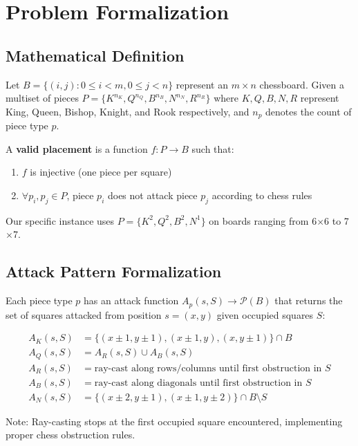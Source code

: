 \documentclass[12pt,a4paper]{article}
\theoremstyle{definition}
\begin{document}
\section{Problem Formalization}

\subsection{Mathematical Definition}

Let $B = \{(i,j) : 0 \leq i < m, 0 \leq j < n\}$ represent an $m \times n$ chessboard. Given a multiset of pieces $P = \{K^{n_K}, Q^{n_Q}, B^{n_B}, N^{n_N}, R^{n_R}\}$ where $K, Q, B, N, R$ represent King, Queen, Bishop, Knight, and Rook respectively, and $n_p$ denotes the count of piece type $p$.

A \textbf{valid placement} is a function $f: P \rightarrow B$ such that:
\begin{enumerate}
\item $f$ is injective (one piece per square)
\item $\forall p_i, p_j \in P$, piece $p_i$ does not attack piece $p_j$ according to chess rules
\end{enumerate}

Our specific instance uses $P = \{K^2, Q^2, B^2, N^1\}$ on boards ranging from 6$\times$6 to 7$\times$7.

\subsection{Attack Pattern Formalization}

Each piece type $p$ has an attack function $A_p(s, S) \rightarrow \mathcal{P}(B)$ that returns the set of squares attacked from position $s=(x,y)$ given occupied squares $S$:

\begin{align}
A_K(s, S) &= \{(x \pm 1, y \pm 1), (x \pm 1, y), (x, y \pm 1)\} \cap B \\
A_Q(s, S) &= A_R(s, S) \cup A_B(s, S) \\
A_R(s, S) &= \text{ray-cast along rows/columns until first obstruction in } S \\
A_B(s, S) &= \text{ray-cast along diagonals until first obstruction in } S \\
A_N(s, S) &= \{(x \pm 2, y \pm 1), (x \pm 1, y \pm 2)\} \cap B \setminus S
\end{align}

Note: Ray-casting stops at the first occupied square encountered, implementing proper chess obstruction rules.
\end{document}
